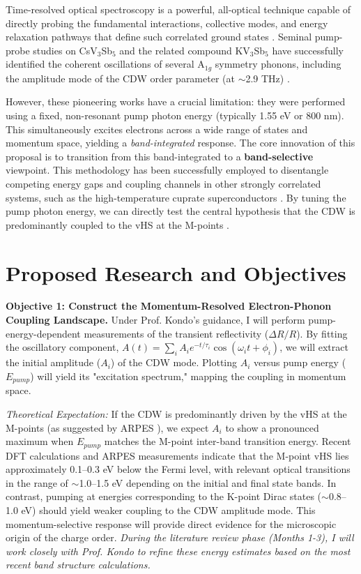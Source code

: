 \documentclass[12pt,a4paper]{article}
\begin{document}
Time-resolved optical spectroscopy is a powerful, all-optical technique capable of directly probing the fundamental interactions, collective modes, and energy relaxation pathways that define such correlated ground states \cite{Demsar2007, Giannetti2016}. Seminal pump-probe studies on CsV$_3$Sb$_5$ and the related compound KV$_3$Sb$_5$ have successfully identified the coherent oscillations of several A$_{1g}$ symmetry phonons, including the amplitude mode of the CDW order parameter (at $\sim$2.9 THz) \cite{Uykur2022}.

However, these pioneering works have a crucial limitation: they were performed using a fixed, non-resonant pump photon energy (typically 1.55 eV or 800 nm). This simultaneously excites electrons across a wide range of states and momentum space, yielding a \textit{band-integrated} response. The core innovation of this proposal is to transition from this band-integrated to a \textbf{band-selective} viewpoint. This methodology has been successfully employed to disentangle competing energy gaps and coupling channels in other strongly correlated systems, such as the high-temperature cuprate superconductors \cite{Coslovich2015, Giannetti2016}. By tuning the pump photon energy, we can directly test the central hypothesis that the CDW is predominantly coupled to the vHS at the M-points \cite{Miao2021, Liang2021}.

\section{Proposed Research and Objectives}
\textbf{Objective 1: Construct the Momentum-Resolved Electron-Phonon Coupling Landscape.} Under Prof. Kondo's guidance, I will perform pump-energy-dependent measurements of the transient reflectivity ($\Delta R/R$). By fitting the oscillatory component, $A(t) = \sum_{i} A_i e^{-t/\tau_i} \cos(\omega_i t + \phi_i)$, we will extract the initial amplitude ($A_i$) of the CDW mode. Plotting $A_i$ versus pump energy ($E_{pump}$) will yield its "excitation spectrum," mapping the coupling in momentum space.

\textit{Theoretical Expectation:} If the CDW is predominantly driven by the vHS at the M-points (as suggested by ARPES \cite{Kang2022}), we expect $A_i$ to show a pronounced maximum when $E_{pump}$ matches the M-point inter-band transition energy. Recent DFT calculations and ARPES measurements \cite{Tan2021, Zhao2021, Cho2021} indicate that the M-point vHS lies approximately 0.1--0.3 eV below the Fermi level, with relevant optical transitions in the range of $\sim$1.0--1.5 eV depending on the initial and final state bands. In contrast, pumping at energies corresponding to the K-point Dirac states ($\sim$0.8--1.0 eV) should yield weaker coupling to the CDW amplitude mode. This momentum-selective response will provide direct evidence for the microscopic origin of the charge order. \textit{During the literature review phase (Months 1-3), I will work closely with Prof. Kondo to refine these energy estimates based on the most recent band structure calculations.}
\end{document}
